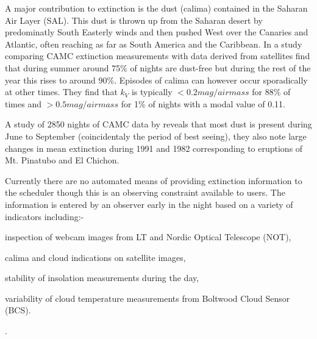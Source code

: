 {{A major contribution to extinction is the dust (calima) contained in the Saharan Air Layer (SAL). This dust is thrown up from the Saharan desert by predominatly South Easterly winds and then pushed West over the Canaries and Atlantic, often reaching as far as South America and the Caribbean. In a study comparing CAMC extinction measurements with data derived from satellites \citet{varela07sat} find that during summer around 75\% of nights are dust-free but during the rest of the year this rises to around 90\%. Episodes of calima can however occur sporadically at other times. They find that $k_V$ is typically $< 0.2 mag/airmass$ for 88\% of times and $> 0.5 mag/airmass$ for 1\% of nights with a modal value of 0.11.

A study of 2850 nights of CAMC data by \citet{guerrero98extinct} reveals that most dust is present during June to September (coincidentaly the period of best seeing), they also note large changes in mean extinction during 1991 and 1982 corresponding to eruptions of Mt. Pinatubo and El Chichon.

Currently there are no automated means of providing extinction information to the scheduler though this is an observing constraint available to users. The information is entered by an observer early in the night based on a variety of indicators including:- \begin{inparaenum}  \item inspection of webcam images from LT and Nordic Optical Telescope (NOT), \item calima and cloud indications on satellite images, \item stability of insolation measurements during the day, \item variability of cloud temperature measurements from Boltwood Cloud Sensor (BCS). \end{inparaenum}.

}}
